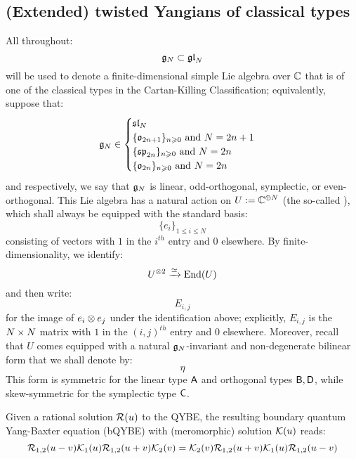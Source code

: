     \subsection{(Extended) twisted Yangians of classical types}
        All throughout:
            $$\mathfrak{g}_N \subset \mathfrak{gl}_N$$
        will be used to denote a finite-dimensional simple Lie algebra over $\mathbb{C}$ that is of one of the classical types in the Cartan-Killing Classification; equivalently, suppose that:
            $$
                \mathfrak{g}_N \in
                \begin{cases}
                    \text{$\mathfrak{sl}_N$}
                    \\
                    \text{$\{ \mathfrak{o}_{2n + 1} \}_{n \geqslant 0}$ and $N = 2n + 1$}
                    \\
                    \text{$\{ \mathfrak{sp}_{2n} \}_{n \geqslant 0}$ and $N = 2n$}
                    \\
                    \text{$\{ \mathfrak{o}_{2n} \}_{n \geqslant 0}$ and $N = 2n$}
                \end{cases}
            $$
        and respectively, we say that $\mathfrak{g}_N$ is linear, odd-orthogonal, symplectic, or even-orthogonal. This Lie algebra has a natural action on $U := \mathbb{C}^{\oplus N}$ (the so-called ), which shall always be equipped with the standard basis:
            $$\{e_i\}_{1 \leq i \leq N}$$
        consisting of vectors with $1$ in the $i^{th}$ entry and $0$ elsewhere. By finite-dimensionality, we identify:
            $$U^{\tensor 2} \xrightarrow[]{\cong} \End(U)$$
        and then write:
            $$E_{i, j}$$
        for the image of $e_i \tensor e_j$ under the identification above; explicitly, $E_{i, j}$ is the $N \x N$ matrix with $1$ in the $(i, j)^{th}$ entry and $0$ elsewhere. Moreover, recall that $U$ comes equipped with a natural $\mathfrak{g}_N$-invariant and non-degenerate bilinear form that we shall denote by:
            $$\eta$$
        This form is symmetric for the linear type $\mathsf{A}$ and orthogonal types $\mathsf{B}, \mathsf{D}$, while skew-symmetric for the symplectic type $\mathsf{C}$.
    
        \begin{definition} \label{def: boundary_quantum_yang_baxter_equations}
            Given a rational solution $\mathcal{R}(u)$ to the QYBE, the resulting boundary quantum Yang-Baxter equation (bQYBE) with (meromorphic) solution $\mathcal{K}(u)$ reads:
                \begin{equation} \label{equation: boundary_quantum_yang_baxter_equations}
                    \mathcal{R}_{1, 2}(u - v) \mathcal{K}_1(u) \mathcal{R}_{1, 2}(u + v) \mathcal{K}_2(v) = \mathcal{K}_2(v) \mathcal{R}_{1, 2}(u + v) \mathcal{K}_1(u) \mathcal{R}_{1, 2}(u - v) 
                \end{equation}
        \end{definition}
    
